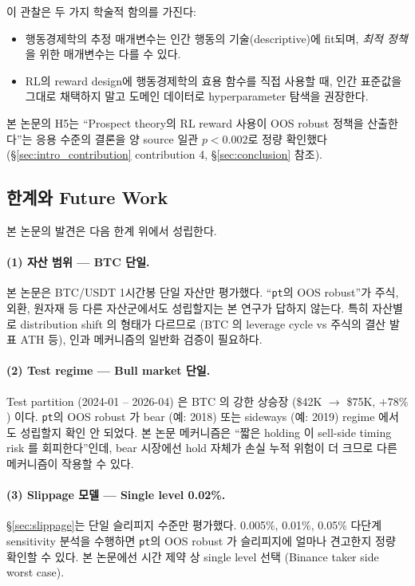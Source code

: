 \documentclass[11pt, a4paper]{article}
\begin{document}
이 관찰은 두 가지 학술적 함의를 가진다:
\begin{itemize}[leftmargin=*]
\item 행동경제학의 추정 매개변수는 인간 행동의 기술(descriptive)에 fit되며,
\emph{최적 정책}을 위한 매개변수는 다를 수 있다.
\item RL의 reward design에 행동경제학의 효용 함수를 직접 사용할 때, 인간
표준값을 그대로 채택하지 말고 도메인 데이터로 hyperparameter 탐색을 권장한다.
\end{itemize}

본 논문의 H5는 ``Prospect theory의 RL reward 사용이 OOS robust 정책을 산출한다''는
응용 수준의 결론을 양 source 일관 $p<0.002$로 정량 확인했다
(\S\ref{sec:intro_contribution} contribution 4, \S\ref{sec:conclusion} 참조).

\subsection{한계와 Future Work}
\label{sec:disc_limitations}

본 논문의 발견은 다음 한계 위에서 성립한다.

\paragraph{(1) 자산 범위 — BTC 단일.}
본 논문은 BTC/USDT 1시간봉 단일 자산만 평가했다. ``\texttt{pt}의 OOS robust''가
주식, 외환, 원자재 등 다른 자산군에서도 성립할지는 본 연구가 답하지 않는다.
특히 자산별로 distribution shift 의 형태가 다르므로 (BTC 의 leverage cycle vs
주식의 결산 발표 ATH 등), 인과 메커니즘의 일반화 검증이 필요하다.

\paragraph{(2) Test regime — Bull market 단일.}
Test partition (2024-01 -- 2026-04) 은 BTC 의 강한 상승장 (\$42K $\to$ \$75K,
$+78\%$) 이다. \texttt{pt}의 OOS robust 가 bear (예: 2018) 또는 sideways
(예: 2019) regime 에서도 성립할지 확인 안 되었다. 본 논문 메커니즘은 ``짧은
holding 이 sell-side timing risk 를 회피한다''인데, bear 시장에선 hold 자체가
손실 누적 위험이 더 크므로 다른 메커니즘이 작용할 수 있다.

\paragraph{(3) Slippage 모델 — Single level 0.02\%.}
\S\ref{sec:slippage}는 단일 슬리피지 수준만 평가했다. 0.005\%, 0.01\%, 0.05\%
다단계 sensitivity 분석을 수행하면 \texttt{pt}의 OOS robust 가 슬리피지에
얼마나 견고한지 정량 확인할 수 있다. 본 논문에선 시간 제약 상 single level
선택 (Binance taker side worst case).
\end{document}
